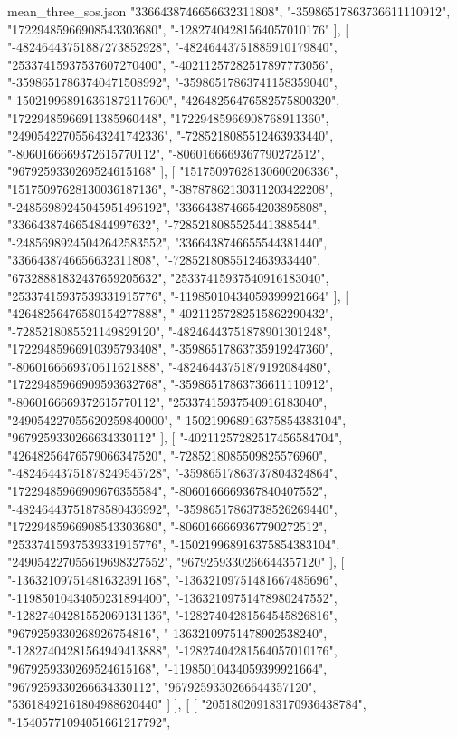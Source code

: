 \begin{filecontents*}[overwrite]{mean_three_sos.json}
    "3366438746656632311808",
    "-35986517863736611110912",
    "17229485966908543303680",
    "-12827404281564057010176"
   ],
   [
    "-48246443751887273852928",
    "-48246443751885910179840",
    "25337415937537607270400",
    "-40211257282517897773056",
    "-35986517863740471508992",
    "-35986517863741158359040",
    "-150219968916361872117600",
    "42648256476582575800320",
    "17229485966911385960448",
    "17229485966908768911360",
    "249054227055643241742336",
    "-7285218085512463933440",
    "-8060166669372615770112",
    "-8060166669367790272512",
    "9679259330269524615168"
   ],
   [
    "15175097628130600206336",
    "15175097628130036187136",
    "-38787862130311203422208",
    "-24856989245045951496192",
    "3366438746654203895808",
    "3366438746654844997632",
    "-7285218085525441388544",
    "-24856989245042642583552",
    "3366438746655544381440",
    "3366438746656632311808",
    "-7285218085512463933440",
    "67328881832437659205632",
    "25337415937540916183040",
    "25337415937539331915776",
    "-11985010434059399921664"
   ],
   [
    "42648256476580154277888",
    "-40211257282515862290432",
    "-7285218085521149829120",
    "-48246443751878901301248",
    "17229485966910395793408",
    "-35986517863735919247360",
    "-8060166669370611621888",
    "-48246443751879192084480",
    "17229485966909593632768",
    "-35986517863736611110912",
    "-8060166669372615770112",
    "25337415937540916183040",
    "249054227055620259840000",
    "-150219968916375854383104",
    "9679259330266634330112"
   ],
   [
    "-40211257282517456584704",
    "42648256476579066347520",
    "-7285218085509825576960",
    "-48246443751878249545728",
    "-35986517863737804324864",
    "17229485966909676355584",
    "-8060166669367840407552",
    "-48246443751878580436992",
    "-35986517863738526269440",
    "17229485966908543303680",
    "-8060166669367790272512",
    "25337415937539331915776",
    "-150219968916375854383104",
    "249054227055619698327552",
    "9679259330266644357120"
   ],
   [
    "-13632109751481632391168",
    "-13632109751481667485696",
    "-11985010434050231894400",
    "-13632109751478980247552",
    "-12827404281552069131136",
    "-12827404281564545826816",
    "9679259330268926754816",
    "-13632109751478902538240",
    "-12827404281564949413888",
    "-12827404281564057010176",
    "9679259330269524615168",
    "-11985010434059399921664",
    "9679259330266634330112",
    "9679259330266644357120",
    "53618492161804988620440"
   ]
  ],
  [
   [
    "205180209183170936438784",
    "-15405771094051661217792",

\end{filecontents*}
